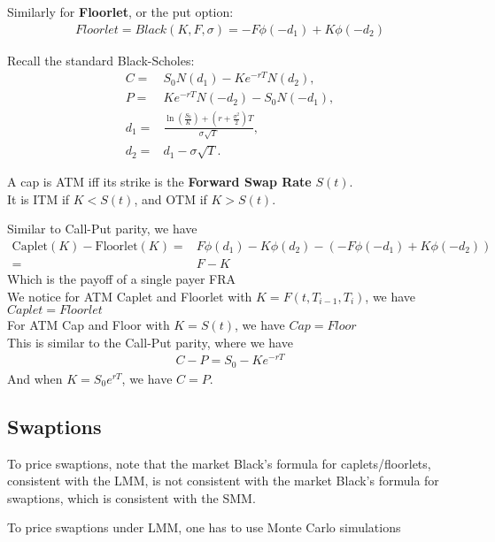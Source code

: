 Similarly for \textbf{Floorlet}, or the put option:
\begin{align*}
    Floorlet = Black(K, F, \sigma) = - F \phi(-d_1) + K \phi(-d_2)
\end{align*}

Recall the standard Black-Scholes:
\begin{align*}
    C =& S_0 N(d_1) - K e^{-rT} N(d_2), \\
    P =& K e^{-rT} N(-d_2) - S_0 N(-d_1),\\
d_1 =& \frac{\ln \left( \frac{S_0}{K} \right) + \left( r + \frac{\sigma^2}{2} \right)T}{\sigma \sqrt{T}},\\
d_2 =& d_1 - \sigma \sqrt{T}.
\end{align*}

\begin{remark}
    A cap is ATM iff its strike is the \textbf{Forward Swap Rate} $S(t)$. \\
    It is ITM if $ K < S(t) $, and OTM if $ K > S(t) $.
\end{remark}
\begin{remark}
    Similar to Call-Put parity, we have
    \begin{align*}
        \text{Caplet}(K) - \text{Floorlet}(K) =& F \phi(d_1) - K \phi(d_2) - ( - F \phi(-d_1) + K \phi(-d_2)) \\
        =& F - K 
    \end{align*}
    Which is the payoff of a single payer FRA\\
    We notice for ATM Caplet and Floorlet with $K = F(t, T_{i-1}, T_i)$, we have $ Caplet= Floorlet $\\
    For ATM Cap and Floor with $ K = S(t) $, we have $ Cap = Floor $ \\
    This is similar to the Call-Put parity, where we have
    \begin{align*}
        C - P = S_0 - K e^{-rT}
    \end{align*}
    And when $K = S_0 e^{rT}$, we have $C = P$.
\end{remark}

\subsection{Swaptions}
To price swaptions, note that the market Black's formula for
caplets/floorlets, consistent with the LMM, is not consistent with the
market Black's formula for swaptions, which is consistent with the
SMM.

To price swaptions under LMM, one has to use Monte Carlo simulations

